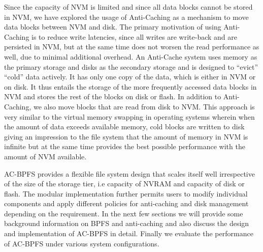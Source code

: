 Since the capacity of NVM is limited and since all data blocks cannot be stored in NVM, we have explored the usage of Anti-Caching \cite{c13} as a mechanism to move data blocks between NVM and disk. The primary motivation of using Anti-Caching is to reduce write latencies, since all writes are write-back and are persisted in NVM, but at the same time does not worsen the read performance as well, due to minimal additional overhead. An Anti-Cache system uses memory as the primary storage and disks as the secondary storage and is designed to “evict” “cold” data actively. It has only one copy of the data, which is either in NVM or on disk. It thus entails the storage of the more frequently accessed data blocks in NVM and stores the rest of the blocks on disk or flash. In addition to Anti-Caching, we also move blocks that are read from disk to NVM. This approach is very similar to the virtual memory swapping in operating systems wherein when the amount of data exceeds available memory, cold blocks are written to disk giving an impression to the file system that the amount of memory in NVM is infinite but at the same time provides the best possible performance with the amount of NVM available.

AC-BPFS provides a flexible file system design that scales itself well irrespective of the size of the storage tier, i.e capacity of NVRAM and capacity of disk or flash. The modular implementation further permits users to modify individual components and apply different policies for anti-caching and disk management depending on the requirement. In the next few sections we will provide some background information on BPFS and anti-caching and also discuss the design and implementation of AC-BPFS in detail. Finally we evaluate the performance of AC-BPFS under various system configurations.   


 
